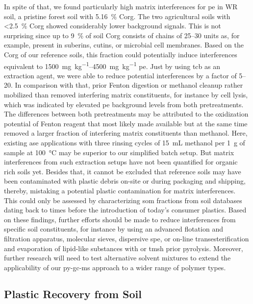 In spite of that, we found particularly high matrix interferences for \ac{pe} in WR soil, a pristine forest soil with \SI{5.16}{\percent} \ac{Corg}. The two agricultural soils with \SI{<2.5}{\percent} \ac{Corg} showed considerably lower background signals.
This is not surprising since up to \SI{9}{\percent} of soil \ac{Corg} consists of  chains of \numrange{25}{30} units \citep{HuPoly2000} as, for example, present in suberins, cutins, or microbial cell membranes. Based on the \ac{Corg} of our reference soils, this fraction could potentially induce interferences equivalent to \SIrange{1500}{4500}{\milli\gram\per\kilo\gram} \ac{pe}. Just by using \ac{tcb} as an extraction agent, we were able to reduce potential interferences by a factor of \numrange{5}{20}. In comparison with that, prior Fenton digestion or methanol cleanup rather mobilized than removed interfering matrix constituents, for instance by cell lysis, which was indicated by elevated \ac{pe} background levels from both pretreatments. The differences between both pretreatments may be attributed to the oxidization potential of Fenton reagent that most likely made available but at the same time removed a larger fraction of interfering matrix constituents than methanol.
Here, existing \ac{ase} applications with three rinsing cycles of \SI{15}{\milli\liter} methanol per \SI{1}{\gram} of sample at \SI{100}{\degreeCelsius} \citep{FullerProcedure2016,DierkesQuantification2019} may be superior to our simplified batch setup. But matrix interferences from such extraction setups have not been quantified for organic rich soils yet.
Besides that, it cannot be excluded that reference soils may have been contaminated with plastic debris on-site or during packaging and shipping, thereby, mistaking a potential plastic contamination for matrix interferences. This could only be assessed by characterizing \ac{som} fractions from soil databases dating back to times before the introduction of today's consumer plastics. Based on these findings, further efforts should be made to reduce interferences from specific soil constituents, for instance by using an advanced flotation and filtration apparatus, molecular sieves, dispersive \ac{spe}, or on-line transesterification and evaporation of lipid-like substances with  or \ac{tmsh} prior pyrolysis. Moreover, further research will need to test alternative solvent mixtures to extend the applicability of our \ac{py-gc-ms} approach to a wider range of polymer types.

\subsection{Plastic Recovery from Soil}

